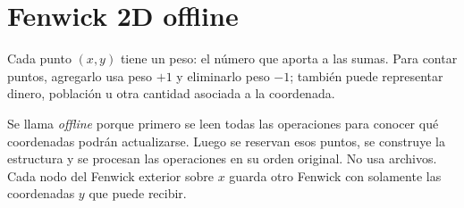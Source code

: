 \section{Fenwick 2D offline}

Cada punto $(x,y)$ tiene un peso: el n\'umero que aporta a las sumas. Para
contar puntos, agregarlo usa peso $+1$ y eliminarlo peso $-1$; tambi\'en puede
representar dinero, poblaci\'on u otra cantidad asociada a la coordenada.

Se llama \emph{offline} porque primero se leen todas las operaciones para
conocer qu\'e coordenadas podr\'an actualizarse. Luego se reservan esos puntos,
se construye la estructura y se procesan las operaciones en su orden original.
No usa archivos. Cada nodo del Fenwick exterior sobre $x$ guarda otro Fenwick
con solamente las coordenadas $y$ que puede recibir.


